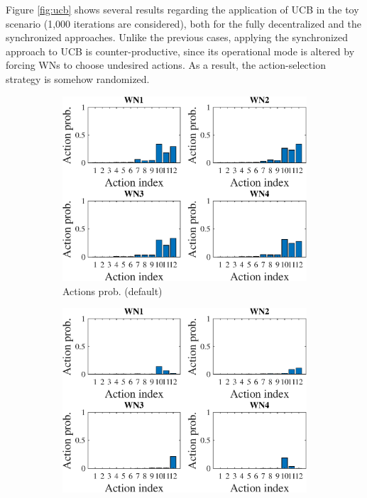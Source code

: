 \documentclass[preprint,12pt]{article}
\begin{document}
Figure \ref{fig:ucb} shows several results regarding the application of UCB in the toy scenario (1,000 iterations are considered), both for the fully decentralized and the synchronized approaches. Unlike the previous cases, applying the synchronized approach to UCB is counter-productive, since its operational mode is altered by forcing WNs to choose undesired actions. As a result, the action-selection strategy is somehow randomized.

\begin{figure}[h!]
	\centering
	\begin{subfigure}[b]{.3\textwidth}
		\includegraphics[width=\textwidth]{images/actions_probability_UCB}
		\caption{Actions prob. (default)}\label{fig:hist_actions_UCB}
	\end{subfigure}
	\begin{subfigure}[b]{.3\textwidth}
		\includegraphics[width=\textwidth]{images/actions_probability_CUCB}

\end{subfigure}
\end{figure}
\end{document}

